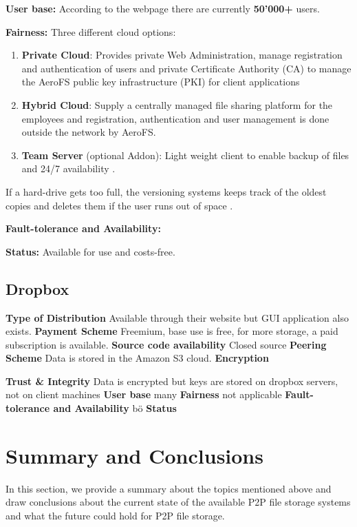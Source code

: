 \textbf{User base:} According to the webpage \cite{aerofs} there are currently \textbf{50'000+} users.

\textbf{Fairness:} Three different cloud options:
\begin{enumerate}
\item \textbf{Private Cloud}: Provides private Web Administration, manage registration and authentication of users and private Certificate Authority (CA) to manage the AeroFS public key infrastructure (PKI) for client applications
\item \textbf{Hybrid Cloud}: Supply a centrally managed file sharing platform for the employees and registration, authentication and user management is done outside the network by AeroFS.
\item \textbf{Team Server} (optional Addon): Light weight client to enable backup of files and 24/7 availability \cite{aerofs:cloud_types}.
\end{enumerate}
If a hard-drive gets too full, the versioning systems keeps track of the oldest copies and deletes them if the user runs out of space \cite{aerofs:USTO.RE}.


\textbf{Fault-tolerance and Availability:} 

\textbf{Status:} Available for use and costs-free.

\subsection{Dropbox} %

\textbf{Type of Distribution}
Available through their website but GUI application also exists.
\textbf{Payment Scheme}
Freemium, base use is free, for more storage, a paid subscription is available.
\textbf{Source code availability}
Closed source
\textbf{Peering Scheme}
Data is stored in the Amazon S3 cloud.
\textbf{Encryption}

\textbf{Trust \& Integrity}
Data is encrypted but keys are stored on dropbox servers, not on client machines
\textbf{User base}
many
\textbf{Fairness}
not applicable
\textbf{Fault-tolerance and Availability}
bö
\textbf{Status}

\section{Summary and Conclusions} In this section, we provide a summary about the topics mentioned above and draw conclusions about the current state of the available P2P file storage systems and what the future could hold for P2P file storage.

